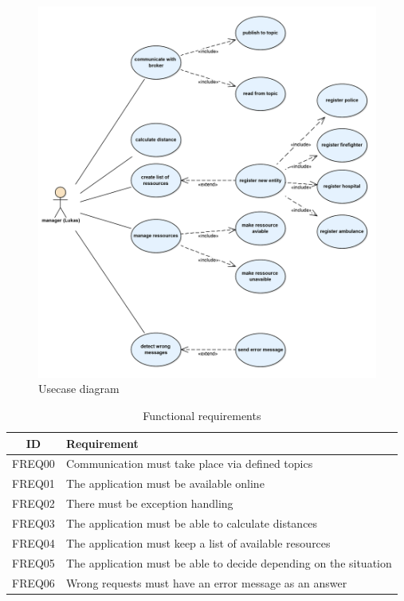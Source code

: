 \begin{figure}[h]
\sidecaption
\includegraphics[scale=0.6]{images/walter/usecase_png.png}
\caption{Usecase diagram}
\label{usecase}
\end{figure}

\begin{table}[h]
    \centering
    \begin{tabular}{c|l}
    ID & Requirement  \\
    \hline
    FREQ00 & Communication must take place via defined topics \\
    FREQ01 & The application must be available online \\
    FREQ02 & There must be exception handling \\
    FREQ03 & The application must be able to calculate distances \\
    FREQ04 & The application must keep a list of available resources\\
    FREQ05 & The application must be able to decide depending on the situation \\
    FREQ06 & Wrong requests must have an error message as an answer \\
    \end{tabular}
    \caption{Functional requirements}
    \label{fr}
\end{table}


